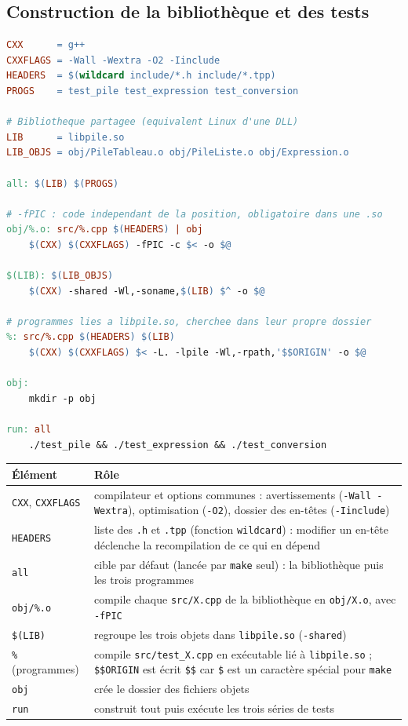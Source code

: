 \documentclass[11pt,a4paper]{article}
\newcommand{\code}[1]{\texttt{#1}}
\begin{document}
\subsection{Construction de la bibliothèque et des tests}

\begin{lstlisting}[language=make, style=sortie, caption={\code{Makefile} (1/2) : bibliotheque et programmes de test}]
CXX      = g++
CXXFLAGS = -Wall -Wextra -O2 -Iinclude
HEADERS  = $(wildcard include/*.h include/*.tpp)
PROGS    = test_pile test_expression test_conversion

# Bibliotheque partagee (equivalent Linux d'une DLL)
LIB      = libpile.so
LIB_OBJS = obj/PileTableau.o obj/PileListe.o obj/Expression.o

all: $(LIB) $(PROGS)

# -fPIC : code independant de la position, obligatoire dans une .so
obj/%.o: src/%.cpp $(HEADERS) | obj
	$(CXX) $(CXXFLAGS) -fPIC -c $< -o $@

$(LIB): $(LIB_OBJS)
	$(CXX) -shared -Wl,-soname,$(LIB) $^ -o $@

# programmes lies a libpile.so, cherchee dans leur propre dossier
%: src/%.cpp $(HEADERS) $(LIB)
	$(CXX) $(CXXFLAGS) $< -L. -lpile -Wl,-rpath,'$$ORIGIN' -o $@

obj:
	mkdir -p obj

run: all
	./test_pile && ./test_expression && ./test_conversion
\end{lstlisting}

\begin{center}
\small
\begin{tabularx}{\linewidth}{l X}
  \toprule
  \textbf{Élément} & \textbf{Rôle} \\
  \midrule
  \code{CXX}, \code{CXXFLAGS} & compilateur et options communes : avertissements
      (\code{-Wall -Wextra}), optimisation (\code{-O2}), dossier des en-têtes
      (\code{-Iinclude}) \\
  \code{HEADERS} & liste des \code{.h} et \code{.tpp} (fonction \code{wildcard}) :
      modifier un en-tête déclenche la recompilation de ce qui en dépend \\
  \code{all} & cible par défaut (lancée par \code{make} seul) : la bibliothèque
      puis les trois programmes \\
  \code{obj/\%.o} & compile chaque \code{src/X.cpp} de la bibliothèque en
      \code{obj/X.o}, avec \code{-fPIC} \\
  \code{\$(LIB)} & regroupe les trois objets dans \code{libpile.so}
      (\code{-shared}) \\
  \code{\%} (programmes) & compile \code{src/test\_X.cpp} en exécutable lié à
      \code{libpile.so} ; \code{\$\$ORIGIN} est écrit \code{\$\$} car
      \code{\$} est un caractère spécial pour \code{make} \\
  \code{obj} & crée le dossier des fichiers objets \\
  \code{run} & construit tout puis exécute les trois séries de tests \\
  \bottomrule
\end{tabularx}
\end{center}
\end{document}
